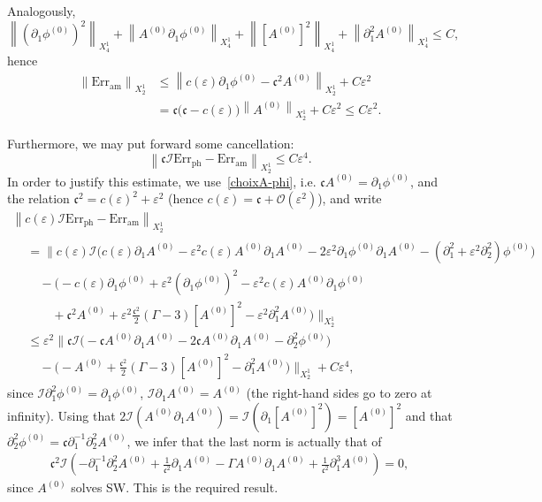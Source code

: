 \documentclass[10pt]{amsart}
\theoremstyle{definition}\newtheorem{defi}[theo]{Definition}\newtheorem{rema}[theo]{Remark}\newtheorem{exam}[theo]{Example}\newtheorem{exem}[theo]{Example}\newtheorem{nota}[theo]{Notation}
\newcommand*\p{\partial}
\newcommand{\amm}{\mathrm{am}}
\newcommand{\phl}{\mathrm{ph}}
\newcommand{\Err}{\mathrm{Err}}
\newcommand*\BO{\mathcal{O}}
\newcommand*\BI{\mathcal{I}}
\newcommand*\cs{{\mathfrak c}}
\newcommand*\ls{\leqslant }
\newcommand*\e{\varepsilon}
\begin{document}
Analogously,
\[
\left\| \left(\p_{1} \phi^{(0)}\right)^2\right\|_{ X^1_4 } + \left\| A^{(0)} \p_{1} \phi^{(0)}\right\|_{ X^1_4 } + \left\| \left[A^{(0)}\right]^2 \right\|_{X^1_{4}} + \left\| \p_1^2 A^{(0)} \right\|_{ X^1_4 }
\ls C,
\]
hence
\begin{align*}
\left\| \Err_{\amm} \right\|_{ X^1_2 } & \ls
\left\| c(\e) \p_{1} \phi^{(0)} - \cs^2 A^{(0)} \right\|_{ X^1_2 } + C \e^2
\\ & = \cs \big(\cs - c(\e) \big) \left\| A^{(0)} \right\|_{ X^1_2 } + C \e^2
\ls C \e^2.
\end{align*}

Furthermore, we may put forward some cancellation:
\[
\left\| \cs \BI {\Err}_{\phl} - {\Err}_{\amm}\right\|_{X^1_2} \ls C \e^4.
\]
In order to justify this estimate, we use~\eqref{choixA-phi}, i.e. $ \cs A^{(0)} = \p_1 \phi^{(0)} $, and the relation $ \cs^2 = c(\e)^2 + \e^2 $ (hence $ c(\e) = \cs + \BO (\e^2) $), and write
\begin{multline*}
\left\| c(\e) \BI {\Err}_{\phl} - {\Err}_{\amm} \right\|_{X^1_2}
\\
\begin{aligned}
& = \Big\| c(\e) \BI \Big(c(\e) \p_{1} A^{(0)} - \e^2 c (\e) A^{(0)} \p_{1} A^{(0)} - 2 \e^2 \p_{1} \phi^{(0)} \p_{1} A^{(0)} - \left(\p_{1}^2 + \e^2 \p^2_{2}\right) \phi^{(0)} \Big)
\\ &
\quad - \Big(- c(\e) \p_{1} \phi^{(0)} + \e^2 \left(\p_{1} \phi^{(0)}\right)^2 - \e^2 c(\e) A^{(0)} \p_{1} \phi^{(0)}
\\ &
\qquad + \cs^2 A^{(0)} + \e^2 \frac{\cs^2}{2} (\Gamma -3) \left[A^{(0)}\right]^2 - \e^2 \p_{1}^2 A^{(0)} \Big) \Big\|_{X^1_2}
\\ &
\ls \e^2 \Big\| \cs \BI \Big(- \cs A^{(0)} \p_{1} A^{(0)} - 2 \cs A^{(0)} \p_{1} A^{(0)} - \p^2_{2} \phi^{(0)} \Big)
\\ &
\quad - \Big(- A^{(0)} + \frac{ \cs^2}{2} (\Gamma -3) \left[A^{(0)}\right]^2 - \p_{1}^2 A^{(0)} \Big) \Big\|_{X^1_2} + C \e^4,
\end{aligned}
\end{multline*}
since $ \BI \p_{1}^2 \phi^{(0)} = \p_{1} \phi^{(0)} $, $ \BI \p_{1} A^{(0)} = A^{(0)} $ (the right-hand sides go to zero at infinity). Using that $ 2 \BI (A^{(0)} \p_{1} A^{(0)}) = \BI (\p_{1} [A^{(0)}]^2) = [A^{(0)}]^2 $ and that $ \p_2^2 \phi^{(0)} = \cs \p_1^{-1} \p_2^2 A^{(0)} $, we infer that the last norm is actually that of
\begin{align*}
\cs^2 \BI \left(- \p_1^{-1} \p_2^2 A^{(0)} + \frac{1}{\cs^2} \p_{1} A^{(0)} - \Gamma A^{(0)} \p_{1} A^{(0)} + \frac{1}{\cs^2} \p_1^3 A^{(0)} \right) = 0,
\end{align*}
since $ A^{(0)}$ solves SW. This is the required result.
\end{document}
